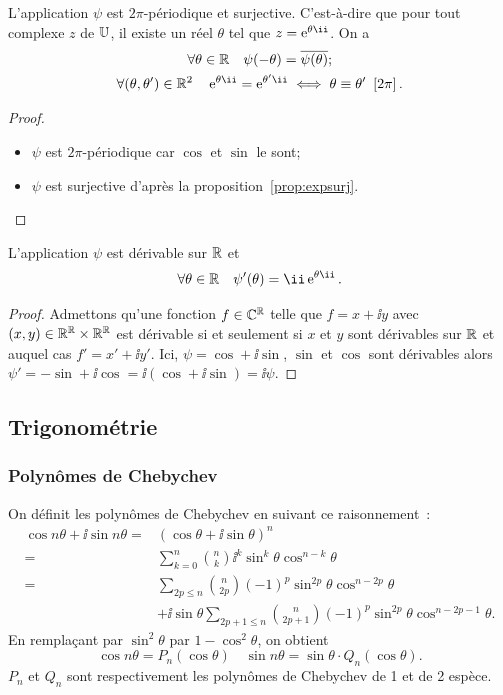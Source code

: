 \begin{prop}
  L'application $\psi$ est  $2\pi$-périodique et surjective. C'est-à-dire que pour tout complexe $z$ de $\mathbb{U}$, il existe un réel $\theta$ tel que $z=\expc{}{\theta}$. On a
  \begin{gather}
    \forall \theta \in \R \quad \psi(-\theta)=\bar{\psi(\theta)};\\
    \forall (\theta, \theta') \in \R^2 \quad \expc{}{\theta}=\expc{}{\theta'} \iff \congru{\theta}{\theta'}{2\pi}.
  \end{gather}
\end{prop}
\begin{proof}
  \begin{itemize}
  \item $\psi$ est $2\pi$-périodique car $\cos$ et $\sin$ le sont;
  \item $\psi$ est surjective d'après la proposition~\ref{prop:expsurj}.
  \end{itemize}
\end{proof}
%
\begin{prop}
  L'application $\psi$ est dérivable sur $\mathbb{R}$ et
  \begin{equation} 
    \forall \theta \in \R \quad \psi'(\theta)=\ii \expc{}{\theta}.
  \end{equation}
\end{prop}
\begin{proof}
  Admettons qu'une fonction $f \in \mathbb{C}^{\mathbb{R}}$ telle que $f=x+\ii y$ avec $(x,y) \in \mathbb{R}^{\mathbb{R}} \times \mathbb{R}^{\mathbb{R}}$ est dérivable si et seulement si $x$ et $y$ sont dérivables sur $\mathbb{R}$ et auquel cas $f'=x' +\ii y'$. Ici, $\psi=\cos +\ii \sin$, $\sin$ et $\cos$ sont dérivables alors $\psi'=-\sin + \ii \cos=\ii (\cos +\ii \sin)=\ii \psi$.
\end{proof}
%
\subsection{Trigonométrie}
\label{subsec:complexestrigo}
\subsubsection{Polynômes de Chebychev}
\label{subsubsec:Chebychev}
\begin{defdef}
  On définit les polynômes de Chebychev en suivant ce raisonnement~:
  \begin{align}
    \cos n \theta + \ii \sin n \theta =& (\cos \theta + \ii \sin \theta)^n\\
    =& \sum_{k=0}^n \binom{n}{k} \ii^k \sin^k \theta \cos^{n-k} \theta\\
    =& \sum_{2p \leq n} \binom{n}{2p} (-1)^p \sin^{2p} \theta \cos^{n-2p} \theta \\ &+ \ii \sin \theta \sum_{2p +1\leq n} \binom{n}{2p+1} (-1)^p \sin^{2p} \theta \cos^{n-2p-1} \theta.
  \end{align}
  En remplaçant par $\sin^2 \theta$ par $1-\cos^2 \theta$, on obtient
  \begin{equation}
    \cos n \theta = P_n(\cos \theta) \quad \sin n \theta = \sin \theta \cdot Q_n(\cos \theta).
  \end{equation}
  $P_n$ et $Q_n$ sont respectivement les polynômes de Chebychev de 1\iere{} et de 2\ieme{} espèce.
\end{defdef}
%
